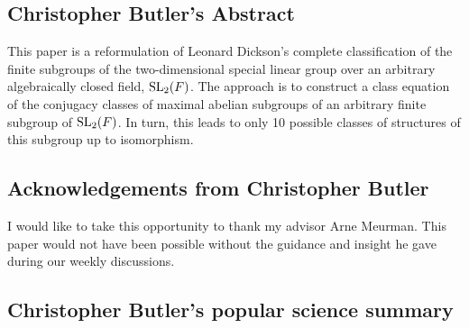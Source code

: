 \subsection{Christopher Butler's Abstract }

This paper is a reformulation of Leonard Dickson's complete classification of the finite subgroups of the two-dimensional special linear group over an arbitrary algebraically closed field, $\operatorname{SL}_2(F)$. The approach is to construct a class equation of the conjugacy classes of maximal abelian subgroups of an arbitrary finite subgroup of $\operatorname{SL}_2(F)$. In turn, this leads to only 10 possible classes of structures of this subgroup up to isomorphism.

\subsection{Acknowledgements from Christopher Butler}

I would like to take this opportunity to thank my advisor Arne Meurman. This paper would not have been possible without the guidance and insight he gave during our weekly discussions.


\subsection{Christopher Butler's popular science summary}

